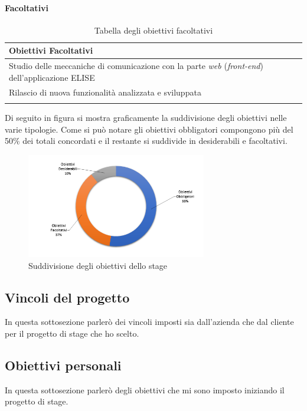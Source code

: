 	\paragraph{Facoltativi}

		\begin{center}
		  \bgroup
		  \def\arraystretch{1.4}
		   \begin{longtable}{ | p{11cm} |} \hline
		   
		    \cellcolor[gray]{0.9} \textbf{Obiettivi Facoltativi} \\ \hline

			Studio delle meccaniche di comunicazione con la parte \textit{web} (\textit{front-end}) dell'applicazione ELISE \\ \hline
			Rilascio di nuova funzionalità analizzata e sviluppata \\ \hline

			
			\caption{Tabella degli obiettivi facoltativi}
			
		    \end{longtable}
		  \egroup
		\end{center}	
	

	Di seguito in figura si mostra graficamente la suddivisione degli obiettivi nelle varie tipologie. Come si può notare gli obiettivi obbligatori compongono più del 50\% dei totali concordati e il restante si suddivide in desiderabili e facoltativi.\\
	
	\begin{figure}[H]
		\centering
	   	\includegraphics[width=0.7\textwidth]{immagini/Percentuale_Obiettivi}
	   	\caption{Suddivisione degli obiettivi dello stage}
	\end{figure}

\subsection{Vincoli del progetto}
In questa sottosezione parlerò dei vincoli imposti sia dall'azienda che dal cliente per il progetto di stage che ho scelto.

\subsection{Obiettivi personali}
In questa sottosezione parlerò degli obiettivi che mi sono imposto iniziando il progetto di stage.
